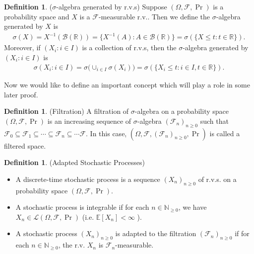 \documentclass[a4paper,11pt]{report}
\theoremstyle{plain} %
\theoremstyle{definition} %
\newtheorem{defn}[thm]{Definition}
\theoremstyle{remark} %
\begin{document}
\begin{defn} ($\sigma$-algebra generated by r.v.s) Suppose $(\Omega, \mathcal{F},\Pr)$ is a probability space and $X$ is a $\mathcal{F}$-measurable r.v.. Then we define the $\sigma$-algebra generated by $X$ is  
\begin{align*}
    \sigma (X) = X^{-1}(\mathcal{B}(\mathbb{R}))=\{X^{-1}(A): A \in \mathcal{B}(\mathbb{R}) \} = \sigma (\{X\leq t :t\in \mathbb{R} \}).
\end{align*}
Moreover, if $(X_{i}:i\in I)$ is a collection of r.v.s, then the $\sigma$-algebra generated by $(X_{i}:i\in I)$ is 
\begin{align*}
    \sigma (X_{i}:i\in I)= \sigma \big( \cup_{i \in I} \sigma (X_{i}) \big)= \sigma (\{X_{i}\leq t: i\in I, t\in \mathbb{R} \}).
\end{align*}

\end{defn}
\par Now we would like to define an important concept which will play a role in some later proof.

\begin{defn}(Filtration) A filtration of $\sigma$-algebra on a probability space $(\Omega, \mathcal{F},\Pr)$ is an increasing sequence of $\sigma$-algebra $( \mathcal{F}_{n} )_{n\geq 0}$ such that $\mathcal{F}_{0} \subseteq \mathcal{F}_{1} \subseteq \cdots \subseteq \mathcal{F}_{n} \subseteq \cdots \mathcal{F}$. In this case, $(\Omega, \mathcal{F}, (\mathcal{F}_{n})_{n\geq 0}, \Pr )$ is called a filtered space.

\end{defn}

\begin{defn} (Adapted Stochastic Processes)
\begin{itemize}
    \item A discrete-time stochastic process is a sequence $(X_{n})_{n\geq 0 }$ of r.v.s. on a probability space $(\Omega, \mathcal{F},\Pr)$.
    
    \item A stochastic process is integrable if for each $n\in \mathbb{N}_{\geq 0}$, we have $X_{n} \in \mathcal{L}(\Omega, \mathcal{F}, \Pr)$ (i.e. $\mathbb{E}[X_{n}]<\infty$ ).
    
    \item A stochastic process $(X_{n})_{n\geq 0}$ is adapted to the filtration $(\mathcal{F}_{n})_{n\geq 0}$ if for each $n\in \mathbb{N}_{\geq 0}$, the r.v. $X_{n}$ is $\mathcal{F}_{n}$-measurable.  
\end{itemize}

\end{defn}
\end{document}

